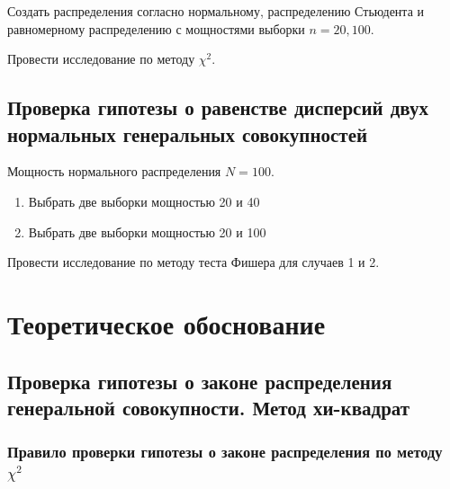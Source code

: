 \documentclass[12pt,a4paper]{article}
\begin{document}
	Создать распределения согласно нормальному, распределению Стьюдента и
	равномерному распределению с мощностями выборки \( n=20, 100 \).

	Провести исследование по методу \( \chi^2 \).

	\subsection{Проверка гипотезы о равенстве дисперсий двух нормальных
		генеральных совокупностей}

	Мощность нормального распределения \( N = 100 \).

	\begin{enumerate}
		\item Выбрать две выборки мощностью 20 и 40
		\item Выбрать две выборки мощностью 20 и 100
	\end{enumerate}

	Провести исследование по методу теста Фишера для случаев 1 и 2.

	\section{Теоретическое обоснование}

	\subsection{Проверка гипотезы о законе распределения генеральной
		совокупности. Метод хи-квадрат}

	\subsubsection{Правило проверки гипотезы о законе распределения по
		методу \( \chi^2 \)}
\end{document}
